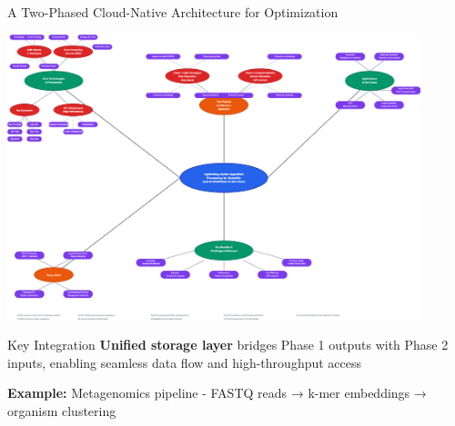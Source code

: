 \documentclass[aspectratio=169]{beamer}
\begin{document}
\begin{frame}{A Two-Phased Cloud-Native Architecture for Optimization}
    \begin{center}
        \includegraphics[width=0.9\textwidth,height=0.6\textheight,keepaspectratio]{../../images/TFM-MindMap.drawio.png}
    \end{center}
    
    \vspace{0.3cm}
    \begin{block}{Key Integration}
        \textbf{Unified storage layer} bridges Phase 1 outputs with Phase 2 inputs, enabling seamless data flow and high-throughput access
    \end{block}
    
    \vspace{0.2cm}
    \textbf{Example:} Metagenomics pipeline - FASTQ reads → k-mer embeddings → organism clustering
\end{frame}
\end{document}
